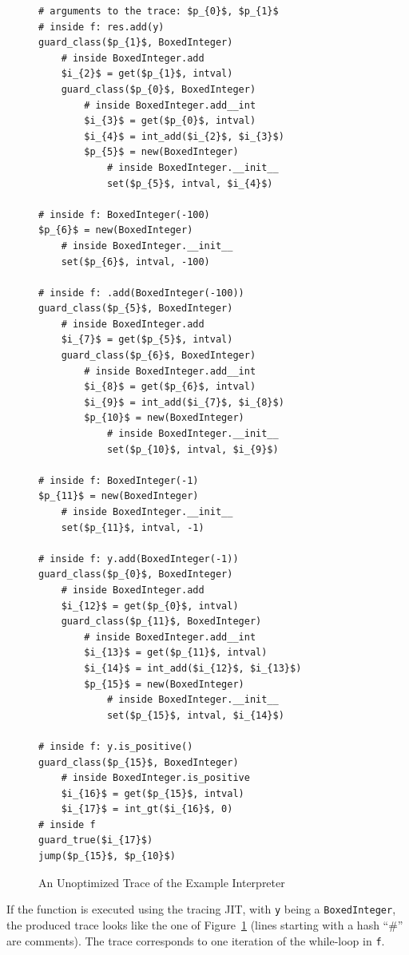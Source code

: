 \documentclass[preprint]{sigplanconf}
\begin{document}
\begin{figure}
\begin{lstlisting}[mathescape,numbers = right]
# arguments to the trace: $p_{0}$, $p_{1}$
# inside f: res.add(y)
guard_class($p_{1}$, BoxedInteger)
    # inside BoxedInteger.add
    $i_{2}$ = get($p_{1}$, intval)
    guard_class($p_{0}$, BoxedInteger)
        # inside BoxedInteger.add__int
        $i_{3}$ = get($p_{0}$, intval)
        $i_{4}$ = int_add($i_{2}$, $i_{3}$)
        $p_{5}$ = new(BoxedInteger)
            # inside BoxedInteger.__init__
            set($p_{5}$, intval, $i_{4}$)

# inside f: BoxedInteger(-100) 
$p_{6}$ = new(BoxedInteger)
    # inside BoxedInteger.__init__
    set($p_{6}$, intval, -100)

# inside f: .add(BoxedInteger(-100))
guard_class($p_{5}$, BoxedInteger)
    # inside BoxedInteger.add
    $i_{7}$ = get($p_{5}$, intval)
    guard_class($p_{6}$, BoxedInteger)
        # inside BoxedInteger.add__int
        $i_{8}$ = get($p_{6}$, intval)
        $i_{9}$ = int_add($i_{7}$, $i_{8}$)
        $p_{10}$ = new(BoxedInteger)
            # inside BoxedInteger.__init__
            set($p_{10}$, intval, $i_{9}$)

# inside f: BoxedInteger(-1)
$p_{11}$ = new(BoxedInteger)
    # inside BoxedInteger.__init__
    set($p_{11}$, intval, -1)

# inside f: y.add(BoxedInteger(-1))
guard_class($p_{0}$, BoxedInteger)
    # inside BoxedInteger.add
    $i_{12}$ = get($p_{0}$, intval)
    guard_class($p_{11}$, BoxedInteger)
        # inside BoxedInteger.add__int
        $i_{13}$ = get($p_{11}$, intval)
        $i_{14}$ = int_add($i_{12}$, $i_{13}$)
        $p_{15}$ = new(BoxedInteger)
            # inside BoxedInteger.__init__
            set($p_{15}$, intval, $i_{14}$)

# inside f: y.is_positive()
guard_class($p_{15}$, BoxedInteger)
    # inside BoxedInteger.is_positive
    $i_{16}$ = get($p_{15}$, intval)
    $i_{17}$ = int_gt($i_{16}$, 0)
# inside f
guard_true($i_{17}$)
jump($p_{15}$, $p_{10}$)
\end{lstlisting}
\caption{An Unoptimized Trace of the Example Interpreter}
\label{fig:unopt-trace}
\end{figure}

If the function is executed using the tracing JIT, with \lstinline{y} being a
\lstinline{BoxedInteger}, the produced trace looks like the one of
Figure~\ref{fig:unopt-trace} (lines starting with a hash ``\#'' are comments).
The trace corresponds to one iteration of the while-loop in \lstinline{f}.
\end{document}
